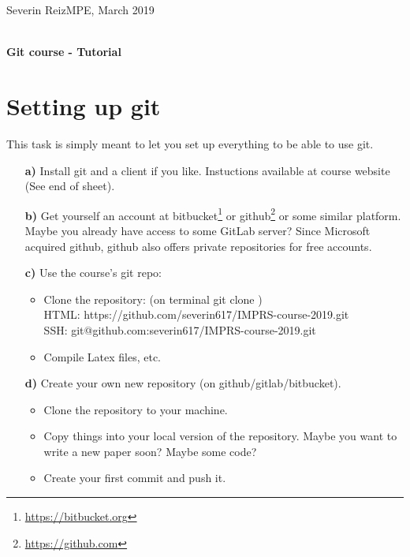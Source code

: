 \documentclass[11pt]{article}
\begin{document}
  {\normalsize  
Severin Reiz\hfill MPE, March 2019\\ 
    \mbox{}\\ [2ex] }

\thispagestyle{empty}
\begin{center}
    {\LARGE\sffamily\bfseries Git course - Tutorial}
\end{center}


\section*{Setting up git}
This task is simply meant to let you set up everything to be able to use git. 
\begin{itemize}
\item[\bf{a)}] Install git and a client if you like. Instuctions available at course website (See end of sheet).%
\item[\bf{b)}] Get yourself an account at bitbucket\footnote{\url{https://bitbucket.org}} or github\footnote{\url{https://github.com}} or some similar platform. Maybe you already have access to some GitLab server? Since Microsoft acquired github, github also offers private repositories for free accounts.
\item[\bf{c)}] Use the course's git repo:
\begin{itemize}
\item Clone the repository: (on terminal git clone )\\ 
HTML: https://github.com/severin617/IMPRS-course-2019.git \\
SSH: git@github.com:severin617/IMPRS-course-2019.git
\item Compile Latex files, etc.
\end{itemize}
\item[\bf{d)}] Create your own new repository (on github/gitlab/bitbucket).
\begin{itemize}
\item Clone the repository to your machine.
\item Copy things into your local version of the repository. Maybe you want to write a new paper soon? Maybe some code?
\item Create your first commit and push it.
\end{itemize}
\end{itemize}
\end{document}
